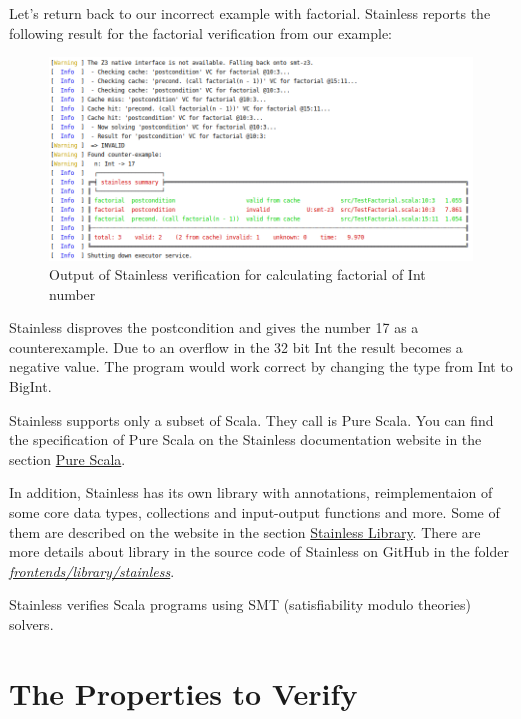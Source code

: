 Let's return back to our incorrect example with factorial.
Stainless reports the following result for the factorial verification from our example:
\begin{figure}[H]
	\centering
		\includegraphics[scale=0.5]{images/output1.png}
	\caption{Output of Stainless verification for calculating factorial of Int number}
	\label{fig:output1}
\end{figure}

Stainless disproves the postcondition and gives the number 17 as a counterexample.
Due to an overflow in the 32 bit Int the result becomes a negative value.
The program would work correct by changing the type from Int to BigInt.

Stainless supports only a subset of Scala.
They call is Pure Scala.
You can find the specification of Pure Scala on the Stainless documentation website \cite{Stainless:documentation} in the section \href{https://epfl-lara.github.io/stainless/purescala.html}{Pure Scala}.

In addition, Stainless has its own library with annotations, reimplementaion of some core data types, collections and input-output functions and more.
Some of them are described on the website in the section \href{https://epfl-lara.github.io/stainless/library.html}{Stainless Library}.
There are more details about library in the source code of Stainless on GitHub \cite{Stainless:github} in the folder \href{https://github.com/epfl-lara/stainless/tree/master/frontends/library/stainless}{\textit{frontends/library/stainless}}.

Stainless verifies Scala programs using SMT (satisfiability modulo theories) solvers. 


\section{The Properties to Verify}

